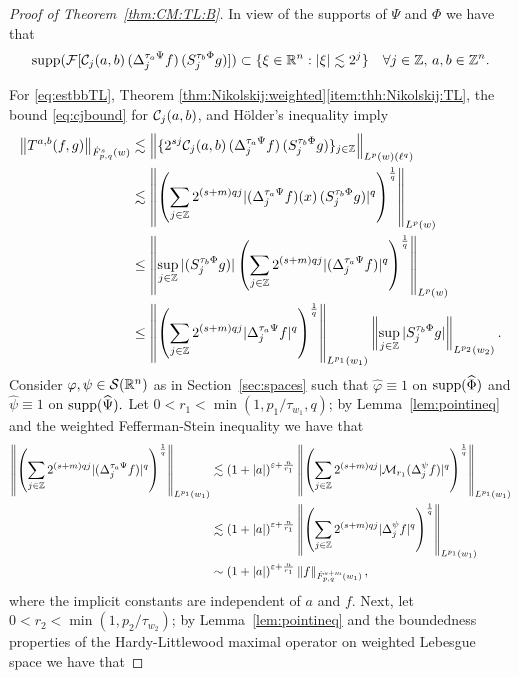 \begin{proof}[Proof of Theorem~\ref{thm:CM:TL:B}]
In view of the supports of $\Psi$ and $\Phi$ we have that 
\begin{equation*}
{\rm{supp}} (\mathcal{F}[\mathcal{C}_j(a,b) \,(\Delta^{ \tau_a \Psi }_{j} f ) \, ( S^{ \tau_b \Phi }_{j} g )])  \subset \{\xi \in {{\mathbb R}^n}: |\xi| \lesssim 2^j \} \quad \forall j \in \mathbb{Z},\,a,b\in \mathbb{Z}^n.
\end{equation*}

For \eqref{eq:estbbTL},
Theorem \ref{thm:Nikolskij:weighted}\eqref{item:thh:Nikolskij:TL}, the bound \eqref{eq:cjbound} for $\mathcal{C}_j(a,b)$, and H\"older's inequality  imply
\begin{align*}
\left\|T^{a,b}(f,g)\right\|_{\dot{F}^s_{p,q}(w)} & \lesssim \left\|\{2^{sj} \mathcal{C}_j(a,b) \,(\Delta^{ \tau_a \Psi }_{j} f ) \, (S^{ \tau_b \Phi }_{j} g)\}_{j\in\mathbb{Z}} \right\|_{L^p(w)(\ell^q)}\\
& \lesssim \left\|\left(\sum\limits_{j \in \mathbb{Z}}  2^{(s +m) q j}  |(\Delta^{ \tau_a \Psi }_{j} f )(x) \, (S^{ \tau_b \Phi }_{j} g)|^q   \right)^\frac{1}{q}\right\|_{L^p(w)}\\
& \le\left\|\sup\limits_{j \in \mathbb{Z}} |(S^{ \tau_b \Phi }_{j} g)| \left(\sum\limits_{j \in \mathbb{Z}}  2^{(s +m) q j}  |(\Delta^{ \tau_a \Psi }_{j} f )|^q   \right)^\frac{1}{q}\right\|_{L^p(w)}\\
& \le \left\|\left(\sum_{j \in \mathbb{Z}}  2^{(s +m) q j}  |\Delta^{ \tau_a \Psi }_{j} f |^q   \right)^\frac{1}{q}\right\|_{L^{p_1}(w_1)} \left\|\sup\limits_{j \in \mathbb{Z}} |S^{ \tau_b \Phi }_{j} g|\right\|_{L^{p_2}(w_2)}.
\end{align*}
Consider $\varphi,\psi\in{\mathcal{S}}({{\mathbb R}^n})$ as in Section~\ref{sec:spaces} such that   $\widehat{\varphi}\equiv 1$ on ${\rm{supp}}(\widehat{\Phi})$ and  $\widehat{\psi}\equiv 1$ on ${\rm{supp}}(\widehat{\Psi}).$  Let   $0<r_1<\min(1, p_1/\tau_{w_1},q)$; by Lemma~\ref{lem:pointineq} and the weighted Fefferman-Stein inequality  we have that  
\begin{align*}
\left\|\left(\sum_{j \in \mathbb{Z}}  2^{(s +m) q j}  |(\Delta^{ \tau_a \Psi }_{j} f )|^q   \right)^\frac{1}{q}\right\|_{L^{p_1}(w_1)}&\lesssim (1+\left\vert a \right\vert)^{\varepsilon+\frac{n}{r_1}}
\left\|\left(\sum_{j \in \mathbb{Z}}  2^{(s +m) q j}  |\mathcal{M}_{r_1}(\Delta^{\psi }_{j} f) |^q   \right)^\frac{1}{q}\right\|_{L^{p_1}(w_1)}\\
&\lesssim (1+\left\vert a \right\vert)^{\varepsilon+\frac{n}{r_1}} \left\|\left(\sum_{j \in \mathbb{Z}}  2^{(s +m) q j}  |\Delta^{\psi }_{j} f|^q   \right)^\frac{1}{q}\right\|_{L^{p_1}(w_1)}\\
&\sim (1+\left\vert a \right\vert)^{\varepsilon+\frac{n}{r_1}}  \left\|f\right\|_{\dot{F}^{s+m}_{p,q}(w_1)},
\end{align*}
where the implicit constants are independent of $a$ and $f.$ Next, let  $0<r_2<\min(1,p_2/\tau_{w_2})$; by Lemma~\ref{lem:pointineq} and the boundedness properties of the Hardy-Littlewood maximal operator on weighted Lebesgue space  we have that  

\end{proof}
